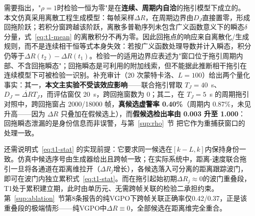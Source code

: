 \documentclass[UTF8,a4paper,zihao=-4]{ctexart}
\begin{document}
需要指出，"\(\rho=1\)时检验一恒为零"是在\textbf{连续、周期内自洽}的拖引模型下成立的。本文仿真采用离散工程生成模型：每帧采样\(\Delta R\)，在周期边界由\(D_J\)直接置零，形成回拖阶跃；若积分窗跨越该阶跃，离散多普勒序列未包含广义函数意义下的瞬态\(\delta\)分量，式~\eqref{eq:t1-mean} 的离散积分不再为零。因此回拖点的响应来自离散化/生成规则，而不是连续相干恒等式本身失效：若按广义函数处理导数并计入瞬态，积分仍等于\(\Delta R(t_2)-\Delta R(t_1)\)。检验一的适用边界应表述为"窗口位于拖引周期内部、不含回拖瞬态"；回拖瞬态是可利用的附加线索，但不能据此推断相干拖引在连续模型下可被检验一识别。补充审计（20 次蒙特卡洛、$L=100$）给出两个量化事实：其一，\textbf{本文主实验不受该效应影响}——联合拖引臂取 $T_J=40$~s、$D_J=\dot{\Delta R}T_J$，而评估窗仅 20~s，跨回拖窗数为 0；其二，在 $T_J=5$~s 的周期拖引对照中，跨回拖窗占 2000/18000 帧，\textbf{真候选虚警率 0.40\%}（周期内 0.87\%，未见升高——因为 $\Delta R$ 只叠加在假候选上），而\textbf{假候选检出率由 0.003 升至 1.000}：回拖瞬态泄漏的是身份信息而非误警，与第~\ref{sup:rho}~节 把它作为重捕获窗口的处理一致。

还需说明式~\eqref{eq:t1-stat} 的实现前提：它要求同一候选在\([k-L,k]\)内保持身份一致。仿真中候选序号由生成器给出且跨帧一致；在实际系统中，距离-速度联合拖引一旦将各通道在距离维拉开（\(\Delta R_j\)增长），各候选落入可分离的距离跟踪波门，即可在波门内独立累积式~\eqref{eq:t1-stat}。而在拖引起始初期\(\Delta R_j\approx0\)的波门重叠段，T1处于累积建立期，此时由单历元、无需跨帧关联的检验二承担约束。第~\ref{sup:ablation}~节第8条报告的纯VGPO下跨帧关联正确率仅0.42/0.37，正是该重叠段的极端情形——纯VGPO中\(\Delta R\equiv0\)，全部候选在距离维完全重合。
\end{document}
